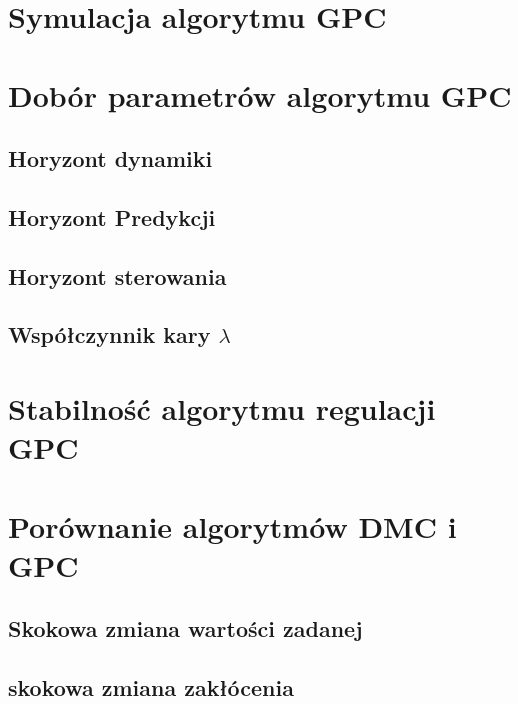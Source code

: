 \documentclass[a4paper, 11pt]{article}
\begin{document}
\section{Symulacja algorytmu GPC}
\section{Dobór parametrów algorytmu GPC}
\subsection{Horyzont dynamiki}
\subsection{Horyzont Predykcji}
\subsection{Horyzont sterowania}
\subsection{Współczynnik kary $\lambda$}
\section{Stabilność algorytmu regulacji GPC}
\section{Porównanie algorytmów DMC i GPC}
\subsection{Skokowa zmiana wartości zadanej}
\subsection{skokowa zmiana zakłócenia}



 
 

 
 
\end{document}
